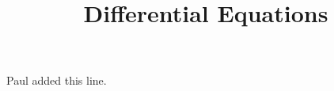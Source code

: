 \documentclass{article}
\title{Differential Equations}
\begin{document}
\maketitle

Paul added this line.
\end{document}
